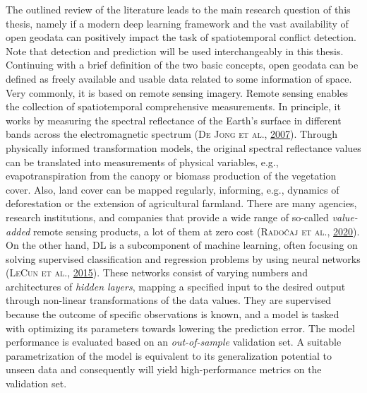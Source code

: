 \documentclass[a4paper,11pt]{article}
\begin{document}
The outlined review of the literature leads to the main research question of this
thesis, namely if a modern deep learning framework and the vast availability of
open geodata can positively impact the task of spatiotemporal conflict detection.
Note that detection and prediction will be used interchangeably in this thesis.
Continuing with a brief definition of the two basic concepts, open geodata can be
defined as freely available and usable data related to some information of space.
Very commonly, it is based on remote sensing imagery. Remote sensing enables the
collection of spatiotemporal comprehensive measurements. In principle,
it works by measuring the spectral reflectance of the Earth's surface in different
bands across the electromagnetic spectrum \textsc{(\textnormal{\textsc{De Jong} \textsc{et al.}}, \textnormal{\protect\hyperlink{ref-dejong2007}{2007}})}. Through physically
informed transformation models, the original spectral reflectance values can be
translated into measurements of physical variables, e.g., evapotranspiration from
the canopy or biomass production of the vegetation cover. Also, land cover can
be mapped regularly, informing, e.g., dynamics of deforestation or the extension
of agricultural farmland. There are many agencies, research institutions, and
companies that provide a wide range of so-called \emph{value-added} remote sensing
products, a lot of them at zero cost \textsc{(\textnormal{\textsc{Radočaj} \textsc{et al.}}, \textnormal{\protect\hyperlink{ref-radocaj2020}{2020}})}. On the other hand, DL is
a subcomponent of machine learning, often focusing on solving supervised
classification and regression problems by using neural networks
\textsc{(\textnormal{\textsc{LeCun} \textsc{et al.}}, \textnormal{\protect\hyperlink{ref-lecun2015}{2015}})}. These networks consist of varying numbers and architectures of
\emph{hidden layers}, mapping a specified input to the desired output through non-linear
transformations of the data values. They are supervised because the outcome
of specific observations is known, and a model is tasked with optimizing its
parameters towards lowering the prediction error. The model performance is
evaluated based on an \emph{out-of-sample} validation set. A suitable parametrization
of the model is equivalent to its generalization potential to unseen data and
consequently will yield high-performance metrics on the validation set.
\end{document}
